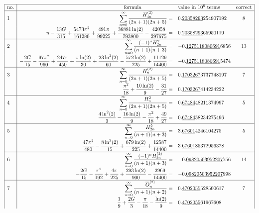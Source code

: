\documentclass[12pt]{book}
\begin{document}
\begin{CJK}{UTF8}{bsmi}
$$\begin{array}{|l|rlc|}
\hline
\text{no.} & 
\text{formula\qquad\qquad\qquad} & 
\text{value in }10^8 \text{ terms} & 
\text{correct} \\
\hline
1 & \displaystyle\sum_{n=0}^\infty\frac{H^{(2)}_{4n}}{(2n+1)(2n+5)}= &
0.\underline{20358293}254907192 & 8 \\
&n\displaystyle-\frac{13G}{315}+\frac{5473\pi^2}{161280}+\frac{491\pi}{99225}+\frac{36881\ln(2)}{793800}-\frac{42058}{297675}= &
0.\underline{20358293}65950119 & \\[5pt]
\hline
2 & \displaystyle \sum_{n=0}^\infty\frac{(-1)^nH_{2n}^2}{(n+1)(n+3)}= &
-0.\underline{1275118080691}6856 & 13\\
& \displaystyle -\frac{2G}{15}-\frac{97\pi^2}{960}+\frac{247\pi}{450}+\frac{\pi\ln(2)}{30}+\frac{23\ln^2(2)}{60}-\frac{572\ln(2)}{225}+\frac{11129}{14400}= &
-0.\underline{1275118080691}5474 & \\[5pt]
\hline
3 & \displaystyle \sum_{n=0}^\infty\frac{H_n^{(2)}}{(2n+1)(2n+5)}= &
0.\underline{1703267}3737748197 & 7 \\
 & \displaystyle \frac{\pi^2}{18}+\frac{10\ln(2)}{9}-\frac{31}{27}= &
0.\underline{1703267}414234222 & \\[5pt]
\hline
4 & \displaystyle \sum_{n=0}^\infty\frac{H_n^2}{(2n+1)(2n+5)}= &
0.\underline{67484}48211374997 & 5 \\
 & \displaystyle \frac{4\ln^2(2)}{3}-\frac{16\ln(2)}{9}-\frac{\pi^2}{18}+\frac{49}{27}= &
0.\underline{67484}58234275496 & \\[5pt]
\hline
5 & \displaystyle \sum_{n=0}^\infty\frac{H_{2n}^2}{(n+1)(n+3)}= &
3.\underline{67601}4246104275 & 5 \\
 & \displaystyle \frac{47\pi^2}{480}-\frac{8\ln^2(2)}{15}+\frac{679\ln(2)}{225}+\frac{12587}{14400}= &
3.\underline{67601}85372956378 & \\[5pt]
\hline
6 & \displaystyle \sum_{n=0}^\infty\frac{(-1)^nH_{2n}^{(2)}}{(n+1)(n+3)}= &
-0.\underline{09820503952207}756 & 14 \\
 & \displaystyle -\frac{2G}{15}-\frac{\pi^2}{192}+\frac{4\pi}{225}+\frac{293\ln(2)}{900}-\frac{2969}{14400}= &
-0.\underline{09820503952207}998 & \\[5pt]
\hline
7 & \displaystyle \sum_{n=0}^\infty\frac{\overline{O}_n^{(2)}}{(n+1)(n+2)}= &
0.\underline{4702055}528500617 & 7 \\
 & \displaystyle \frac{1}{9}+\frac{2G}{3}-\frac{\pi}{18}-\frac{\ln(2)}{9}= &
0.\underline{4702055}61967608 & \\[5pt]

\end{array}$$
\end{CJK}
\end{document}
